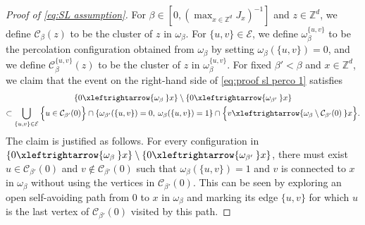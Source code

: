 \documentclass[11pt,a4paper]{article}
\numberwithin{equation}{section}
\theoremstyle{plain}
\theoremstyle{definition}
\newcommand\1{\mathds{1}}
\newcommand{\connect}{\xleftrightarrow}
\begin{document}
\begin{proof}[Proof of \eqref{eq:SL assumption}]
For $\beta \in [0,(\max_{x\in \mathbb Z^d} J_x)^{-1}]$ and $z\in \mathbb Z^d$, we define $\mathcal C_{\beta}(z)$ to be the cluster of $z$ in $\omega_\beta$. For $\{u,v\}\in \mathcal E$, we define $\omega^{\{u,v\}}_\beta$ to be the percolation configuration obtained from $\omega_\beta$ by setting $\omega_{\beta}(\{u,v\})=0$,
and we define $\mathcal C_\beta^{\{u,v\}}(z)$ to be the cluster of $z$ in $\omega_\beta^{\{u,v\}}$.
For fixed $\beta'<\beta$ and $x\in \mathbb Z^d$, we claim that
the event on the right-hand side of \eqref{eq:proof sl perco 1} satisfies
\begin{multline}
\label{eq:proof perco sl 2}
 \{0\connect{\omega_\beta\:} x\}\setminus\{0\connect{\omega_{\beta'}\:} x\}
\\\subset \bigcup_{\{u,v\}\in \mathcal E} \Big\{u \in \mathcal{C}_{\beta'}(0) \Big\} \cap\{\omega_{\beta'}(\{u,v\})=0, \: \omega_{\beta}(\{u,v\})=1\} \cap \Big\{v\connect{\omega_{\beta}\setminus \mathcal{C}_{\beta'}(0) \:} x \Big\}.
 \end{multline}
The claim is justified as follows.
For every configuration in $\{0\connect{\omega_\beta\:} x\}\setminus\{0\connect{\omega_{\beta'}\:} x\}$, there must exist $u\in \mathcal C_{\beta'}(0)$ and $v \notin \mathcal C_{\beta'}(0)$ such that $\omega_\beta(\{u,v\})=1$ and  $v$ is connected to $x$ in $\omega_{\beta}$ without using the vertices in $\mathcal{C}_{\beta'}(0)$. This can be seen by exploring an open self-avoiding path from $0$ to $x$ in $\omega_\beta$ and marking its edge $\{u,v\}$ for which $u$ is the last vertex of $\mathcal C_{\beta'}(0)$ visited by this path.


\end{proof}
\end{document}

